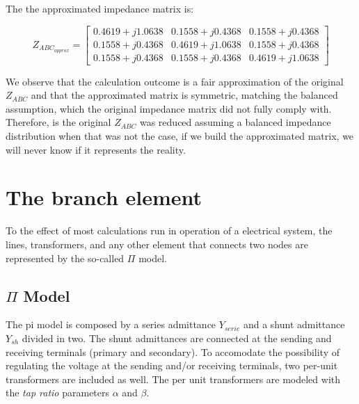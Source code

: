 \documentclass{tufte-book}
\begin{document}
The the approximated impedance matrix is:

$$
Z_{ABC_{approx}} = \left[ \begin{array}{ccc}
0.4619 + j1.0638 & 0.1558 + j0.4368 & 0.1558 + j0.4368 \\
0.1558 + j0.4368 & 0.4619 + j1.0638 & 0.1558 + j0.4368 \\ 
0.1558 + j0.4368 & 0.1558 + j0.4368 & 0.4619 + j1.0638
\end{array} \right]
$$

We observe that the calculation outcome is a fair approximation of the original $Z_{ABC}$ and that the approximated matrix is symmetric, matching the balanced assumption, which the original impedance matrix did not fully comply with. Therefore, is the original $Z_{ABC}$ was reduced assuming a balanced impedance distribution when that was not the case, if we build the approximated matrix, we will never know if it represents the reality.





\chapter{The branch element}

To the effect of most calculations run in operation of a electrical system, the lines, transformers, and any other element that connects two nodes are represented by the so-called $\Pi$ model.


\section{$\Pi$ Model}


The pi model is composed by a series admittance  $Y_{serie}$ and a shunt admittance $Y_{sh}$ divided in two. The shunt admittances are connected at the sending and receiving terminals (primary and secondary). To accomodate the possibility of regulating the voltage at the sending and/or receiving terminals, two per-unit transformers are included as well. The per unit transformers are modeled with the \textit{tap ratio} parameters $\alpha$ and $\beta$.
\end{document}
